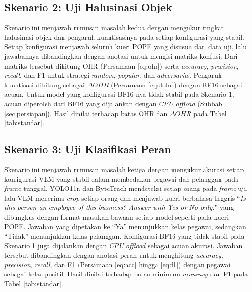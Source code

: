 \subsection{Skenario 2: Uji Halusinasi Objek}
Skenario ini menjawab rumusan masalah kedua dengan mengukur tingkat halusinasi objek dan pengaruh kuantisasinya pada setiap konfigurasi yang stabil. Setiap konfigurasi menjawab seluruh kueri POPE yang disusun dari data uji, lalu jawabannya dibandingkan dengan anotasi untuk mengisi matriks konfusi. Dari matriks tersebut dihitung OHR (Persamaan \ref{eq:ohr}) serta \textit{accuracy}, \textit{precision}, \textit{recall}, dan F1 untuk strategi \textit{random}, \textit{popular}, dan \textit{adversarial}. Pengaruh kuantisasi dihitung sebagai $\Delta OHR$ (Persamaan \ref{eq:dohr}) dengan BF16 sebagai acuan. Untuk model yang konfigurasi BF16-nya tidak stabil pada Skenario 1, acuan diperoleh dari BF16 yang dijalankan dengan \textit{CPU offload} (Subbab \ref{sec:persiapan}). Hasil dinilai terhadap batas OHR dan $\Delta OHR$ pada Tabel \ref{tab:standar}.

\subsection{Skenario 3: Uji Klasifikasi Peran}
Skenario ini menjawab rumusan masalah ketiga dengan mengukur akurasi setiap konfigurasi VLM yang stabil dalam membedakan pegawai dan pelanggan pada \textit{frame} tunggal. YOLO11n dan ByteTrack mendeteksi setiap orang pada \textit{frame} uji, lalu VLM menerima \textit{crop} setiap orang dan menjawab kueri berbahasa Inggris ``\textit{Is this person an employee of this business? Answer with Yes or No only.}'' yang dibungkus dengan format masukan bawaan setiap model seperti pada kueri POPE. Jawaban yang dipetakan ke ``Ya'' menunjukkan kelas pegawai, sedangkan ``Tidak'' menunjukkan kelas pelanggan. Konfigurasi BF16 yang tidak stabil pada Skenario 1 juga dijalankan dengan \textit{CPU offload} sebagai acuan akurasi. Jawaban tersebut dibandingkan dengan anotasi peran untuk menghitung \textit{accuracy}, \textit{precision}, \textit{recall}, dan F1 (Persamaan \ref{eq:acc} hingga \ref{eq:f1}) dengan pegawai sebagai kelas positif. Hasil dinilai terhadap batas minimum \textit{accuracy} dan F1 pada Tabel \ref{tab:standar}.


